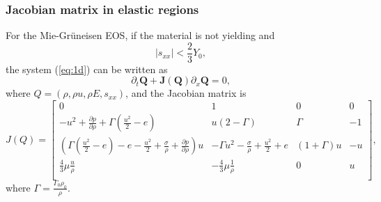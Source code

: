 \documentclass[review]{elsarticle}
\begin{document}
\subsubsection{Jacobian matrix in elastic regions} %
For the Mie-Gr\"uneisen EOS, if the material is not yielding and 
\begin{equation}
  |s_{xx}| < \frac{2}{3}Y_0,
\end{equation}
the system (\ref{eq:1d}) can be written as
\begin{equation}
 \partial_t \mathbf{Q} +\mathbf{J}(\mathbf{{Q}})\partial_x\mathbf{Q} = 0,
\end{equation}
where $Q = (\rho, \rho u, \rho E, s_{xx})$, and the Jacobian matrix is 
\begin{equation}\label{eq:Jcb}
  J(Q) = \left[\begin{array}{llll}
      0 & 1 & 0 & 0 \\
      -u^2 + \frac{\partial p}{\partial \rho} +\Gamma(\frac{u^2}{2}-e)& u(2-\Gamma)& \Gamma & -1 \\
	  (\Gamma(\frac{u^2}{2}-e)-e-\frac{u^2}{2}+\frac{\sigma}{\rho}+\frac{\partial p}{\partial \rho})u & -\Gamma u^2 -\frac{\sigma}{\rho}+\frac{u^2}{2} +e & (1+\Gamma)u& -u\\
    \frac{4}{3}\mu\frac{u}{\rho} & -\frac{4}{3}\mu\frac{1}{\rho}& 0 & u \\
\end{array}
\right],
\end{equation}
where $\Gamma = \frac{\Gamma_0\rho_0}{\rho} $.
\end{document}
